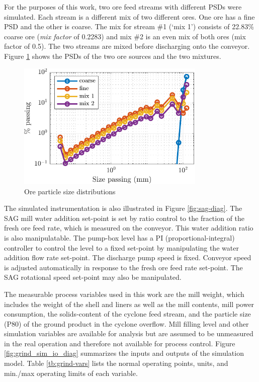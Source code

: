 For the purposes of this work, two ore feed streams with different PSDs were simulated. Each stream is a different mix of two different ores. One ore has a fine PSD and the other is coarse. The mix for stream \#1 (`mix 1') consists of 22.83\% coarse ore (\textit{mix factor} of 0.2283) and mix \#2 is an even mix of both ores (mix factor of 0.5). The two streams are mixed before discharging onto the conveyor. Figure \ref{fig:coarse_fine_psd_plot} shows the PSDs of the two ore sources and the two mixtures.

\begin{figure}[htp]
	\centering
	\includegraphics[width=9cm]{images/coarse_fine_psd_plot.pdf}
	\caption{Ore particle size distributions}
	\label{fig:coarse_fine_psd_plot}
\end{figure}

The simulated instrumentation is also illustrated in Figure \ref{fig:sag-diag}. The SAG mill water addition set-point is set by ratio control to the fraction of the fresh ore feed rate, which is measured on the conveyor. This water addition ratio is also manipulatable. The pump-box level has a PI (proportional-integral) controller to control the level to a fixed set-point by manipulating the water addition flow rate set-point. The discharge pump speed is fixed. Conveyor speed is adjusted automatically in response to the fresh ore feed rate set-point. The SAG rotational speed set-point may also be manipulated.

The measurable process variables used in this work are the mill weight, which includes the weight of the shell and liners as well as the mill contents, mill power consumption, the solids-content of the cyclone feed stream, and the particle size (P80) of the ground product in the cyclone overflow. Mill filling level and other simulation variables are available for analysis but are assumed to be unmeasured in the real operation and therefore not available for process control.  Figure \ref{fig:grind_sim_io_diag} summarizes the inputs and outputs of the simulation model. Table \ref{tb:grind-vars} lists the normal operating points, units, and min./max operating limits of each variable. 


